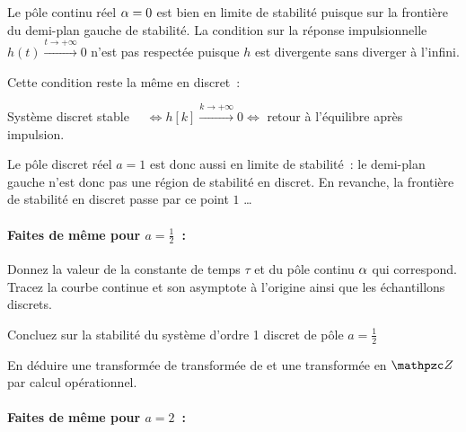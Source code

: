 \begin{remarque}
  Le pôle continu réel $\alpha=0$ est bien en limite de stabilité puisque
  sur la frontière du demi-plan gauche de stabilité. La condition sur
  la réponse impulsionnelle $h(t) \xrightarrow{t\to +\infty} 0 $ n'est
  pas respectée puisque $h$ est divergente sans diverger à l'infini.

  Cette condition reste la même en discret~:

  Système discret stable
  $\quad \iff h[k] \xrightarrow{k\to +\infty} 0 \iff$ \og{}retour à
  l'équilibre après impulsion. \fg{}


  Le pôle discret réel $a=1$ est donc aussi en limite de stabilité~:
  le demi-plan gauche n'est donc pas une région de stabilité en
  discret. En revanche, la frontière de stabilité en discret passe par
  ce point $1$ \dots
\end{remarque}

\paragraph{Faites de même pour $a=\frac{1}{2}$~:}


Donnez la valeur de la constante de temps $\tau$ et du pôle continu
$\alpha$ qui correspond. Tracez la courbe continue et son asymptote à
l'origine ainsi que les échantillons discrets.

Concluez sur la stabilité du système d'ordre 1 discret de pôle
$a=\frac{1}{2}$

En déduire une transformée de transformée de \Laplace{} et une
transformée en $\TZ{}$ par calcul opérationnel.

\paragraph{Faites de même pour $a=2$~:}

